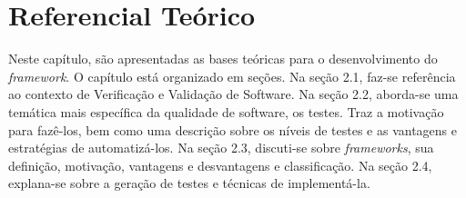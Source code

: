\chapter[Referencial Teórico]{Referencial Teórico}
Neste capítulo, são apresentadas as bases teóricas para o desenvolvimento do
\textit{framework}. O capítulo está organizado em seções. Na seção 2.1, faz-se
referência ao contexto de Verificação e Validação de Software. Na seção 2.2,
aborda-se uma temática mais específica da qualidade de software, os testes.
Traz a motivação para fazê-los, bem como uma descrição sobre os níveis de
testes e as vantagens e estratégias de automatizá-los. Na seção 2.3, discuti-se
sobre \textit{frameworks}, sua definição, motivação, vantagens e desvantagens e
classificação. Na seção 2.4, explana-se sobre a geração de testes e técnicas de
implementá-la.

